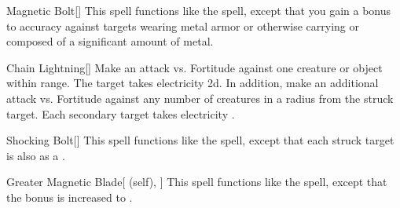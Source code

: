 \lowercase{\hypertarget{spell:Magnetic Bolt}{}}\label{spell:Magnetic Bolt}
\begin{freeability}[\nth{3}]{\hypertarget{spell:Magnetic Bolt}{Magnetic Bolt}}[]
This spell functions like the  spell, except that you gain a  bonus to accuracy against targets wearing metal armor or otherwise carrying or composed of a significant amount of metal.
\end{freeability}
\vspace{0.25em}



\lowercase{\hypertarget{spell:Chain Lightning}{}}\label{spell:Chain Lightning}
\begin{freeability}[\nth{4}]{\hypertarget{spell:Chain Lightning}{Chain Lightning}}[]
Make an attack vs. Fortitude against one creature or object within \rngmed range.
\hit The target takes electricity  \plus2d.
In addition, make an additional attack vs. Fortitude against any number of creatures in a \areasmall radius from the struck target.
\hit Each secondary target takes electricity .
\end{freeability}
\vspace{0.25em}



\lowercase{\hypertarget{spell:Shocking Bolt}{}}\label{spell:Shocking Bolt}
\begin{freeability}[\nth{4}]{\hypertarget{spell:Shocking Bolt}{Shocking Bolt}}[]
This spell functions like the  spell, except that each struck target is also  as a .
\end{freeability}
\vspace{0.25em}



\lowercase{\hypertarget{spell:Greater Magnetic Blade}{}}\label{spell:Greater Magnetic Blade}
\begin{attuneability}[\nth{6}]{\hypertarget{spell:Greater Magnetic Blade}{Greater Magnetic Blade}}[ (self), ]
This spell functions like the  spell, except that the bonus is increased to .
\end{attuneability}
\vspace{0.25em}



